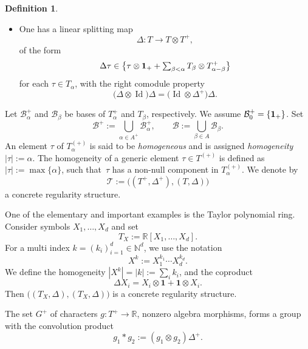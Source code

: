 \documentclass[JEP,XML,SOM,Unicode,published]{cedram}
\theoremstyle{plain}
\theoremstyle{definition}
\newtheorem*{defn*} {Definition}
\DeclareMathOperator{\iden}{Id}
\newcommand{\unit}{\mathbf{1}}
\newcommand{\bbN}{\mathbb{N}}
\newcommand{\bbR}{\mathbb{R}}
\newcommand{\mcB}{\mathcal{B}}
\begin{document}
\begin{defn*}
\begin{itemize}
\item One has a linear splitting map\vspace*{-3pt}
\[
\Delta : T \to T\otimes T^+,
\]
of the form\vspace*{-3pt}
\begin{equation}
\label{EqDelta}
\Delta \tau \in \bigl\{\tau\otimes {\bf 1}_+ + \textstyle\sum_{\beta<\alpha} T_\beta\otimes T^+_{\alpha-\beta}\bigr\}
\end{equation}
for each $\tau\in T_\alpha$, with the right comodule property\vspace*{-3pt}
\begin{equation*}
\bigl(\Delta\otimes \iden\bigr)\Delta = \bigl(\iden\otimes \Delta^+\bigr)\Delta.
\end{equation*}
\end{itemize}
Let $\mcB_\alpha^+$ and $\mcB_\beta$ be bases of $T_\alpha^+$ and $T_\beta$, respectively. We assume $\mcB_0^+=\{{\bf1}_+\}$. Set\vspace*{-1pt}
\[
\mcB^+ := \bigcup_{\alpha\in A^+} \mcB_\alpha^+, \qquad \mcB := \bigcup_{\beta\in A} \mcB_\beta.
\]
An element $\tau$ of $T_\alpha^{(+)}$ is said to be \emph{homogeneous} and is assigned \emph{{homogeneity}} $|\tau| := \alpha$. The homogeneity of a generic element $\tau\in T^{(+)}$ is defined as $|\tau| := \max\{\alpha\}$, such that~$\tau$ has a non-null component in $T^{(+)}_\alpha$.
We denote by\vspace*{-3pt}
\[
\mathscr{T} := \bigl((T^+,\Delta^+), (T,\Delta)\bigr)
\]
a concrete regularity structure.
\end{defn*}

One of the elementary and important examples is the Taylor polynomial ring. Consider symbols $X_1, \dots, X_d$ and set\vspace*{-3pt}
\[
T_X := \bbR[X_1,\dots, X_d].
\]
For a multi index $k=(k_i)_{i=1}^d\in\bbN^d$, we use the notation\vspace*{-3pt}
\[
X^k := X_1^{k_1}\cdots X_d^{k_d}.
\]
We define the homogeneity $|X^k|=|k|:=\sum_ik_i$, and the coproduct\vspace*{-1pt}
\begin{equation} \label{EqCoproductPolynomials}
\Delta X_i=X_i\otimes\unit+\unit\otimes X_i.
\end{equation}
Then $\bigl((T_X,\Delta),(T_X,\Delta)\bigr)$ is a concrete regularity structure.

The set $G^+$ of characters $g : T^+\to\bbR$, \ie nonzero algebra morphisms, forms a group with the convolution product\vspace*{-3pt}
\[
g_1*g_2:=(g_1\otimes g_2)\Delta^+.
\]
\end{document}
